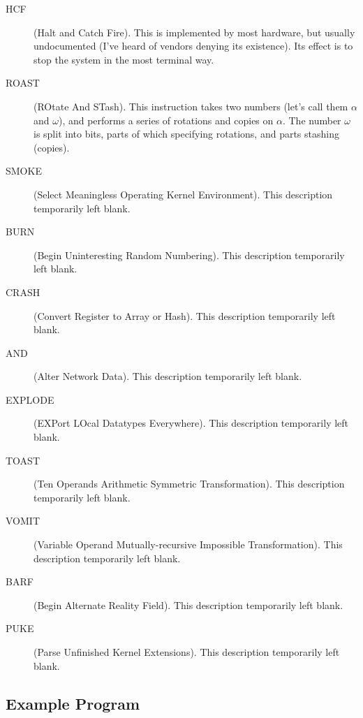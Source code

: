 \documentclass[12pt,titlepage,a4paper,twoside]{article}
\begin{document}
\begin{description}
\item[HCF] (Halt and Catch Fire).
This is implemented by most hardware, but usually undocumented (I've heard
of vendors denying its existence). Its effect is to stop the system in
the most terminal way.

\item[ROAST] (ROtate And STash).
This instruction takes two numbers (let's call them $\alpha$ and
$\omega$), and performs a series of rotations and copies on $\alpha$. The
number $\omega$ is split into bits, parts of which specifying rotations,
and parts stashing (copies).

\item[SMOKE] (Select Meaningless Operating Kernel Environment).
This description temporarily left blank.

\item[BURN] (Begin Uninteresting Random Numbering).
This description temporarily left blank.

\item[CRASH] (Convert Register to Array or Hash).
This description temporarily left blank.

\item[AND] (Alter Network Data).
This description temporarily left blank.

\item[EXPLODE] (EXPort LOcal Datatypes Everywhere).
This description temporarily left blank.

\item[TOAST] (Ten Operands Arithmetic Symmetric Transformation).
This description temporarily left blank.

\item[VOMIT] (Variable Operand Mutually-recursive Impossible Transformation).
This description temporarily left blank.

\item[BARF] (Begin Alternate Reality Field).
This description temporarily left blank.

\item[PUKE] (Parse Unfinished Kernel Extensions).
This description temporarily left blank.

\end{description}

\subsection{Example Program}
\label{bytecode interpreter:example program}
\end{document}
